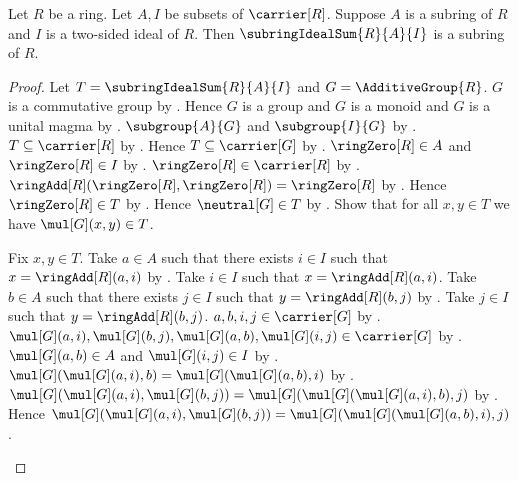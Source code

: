 \begin{theorem}\label{subring_ideal_sum_is_subring}
    Let $R$ be a ring.
    Let $A,I$ be subsets of $\carrier[R]$.
    Suppose $A$ is a subring of $R$ and $I$ is a two-sided ideal of $R$.
    Then $\subringIdealSum{R}{A}{I}$ is a subring of $R$.
\end{theorem}
\begin{proof}
    Let $T=\subringIdealSum{R}{A}{I}$ and $G=\AdditiveGroup{R}$.
    $G$ is a commutative group by
        .
    Hence $G$ is a group and $G$ is a monoid and $G$ is a unital magma by
        .
    $\subgroup{A}{G}$ and $\subgroup{I}{G}$ by
        .
    $T\subseteq\carrier[R]$ by
        .
    Hence $T\subseteq\carrier[G]$ by .
    $\ringZero[R]\in A$ and $\ringZero[R]\in I$ by
        .
    $\ringZero[R]\in\carrier[R]$ by .
    $\ringAdd[R](\ringZero[R],\ringZero[R])=\ringZero[R]$ by
        .
    Hence $\ringZero[R]\in T$ by .
    Hence $\neutral[G]\in T$ by .
    Show that for all $x,y\in T$ we have $\mul[G](x,y)\in T$.
    \begin{subproof}
        Fix $x,y\in T$.
        Take $a\in A$ such that there exists $i\in I$ such that
            $x=\ringAdd[R](a,i)$ by .
        Take $i\in I$ such that $x=\ringAdd[R](a,i)$.
        Take $b\in A$ such that there exists $j\in I$ such that
            $y=\ringAdd[R](b,j)$ by .
        Take $j\in I$ such that $y=\ringAdd[R](b,j)$.
        $a,b,i,j\in\carrier[G]$ by
            .
        $\mul[G](a,i),\mul[G](b,j),
            \mul[G](a,b),\mul[G](i,j)\in\carrier[G]$ by
            .
        $\mul[G](a,b)\in A$ and $\mul[G](i,j)\in I$ by
            .
        $\mul[G](\mul[G](a,i),b)
            =\mul[G](\mul[G](a,b),i)$ by
            .
        $\mul[G](\mul[G](a,i),\mul[G](b,j))
            =\mul[G](\mul[G](\mul[G](a,i),b),j)$ by
            .
        Hence $\mul[G](\mul[G](a,i),\mul[G](b,j))
            =\mul[G](\mul[G](\mul[G](a,b),i),j)$.

\end{subproof}
\end{proof}
